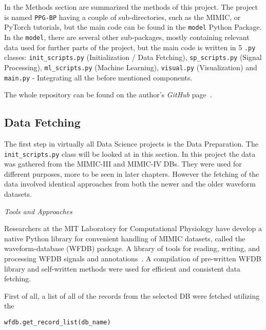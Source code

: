 In the Methods section are summarized the methods of this project.
The project is named \texttt{PPG-BP} having a couple of sub-directories, such as the MIMIC, or PyTorch tutorials, but the main code can be found in the \texttt{model} Python Package.
In the \texttt{model}, there are several other sub-packages, mostly containing relevant data used for further parts of the project, but the main code is written in 5 \texttt{.py} classes:
\texttt{init\_scripts.py} (Initialization / Data Fetching), \texttt{sp\_scripts.py} (Signal Processing), \texttt{ml\_scripts.py} (Machine Learning), \texttt{visual.py} (Visualization) and \texttt{main.py} - Integrating all the before mentioned components.

The whole repository can be found on the author's \textit{GitHub} page~\cite{jasinskasHtjasPPGBP2024}.

\subsection{Data Fetching}
\label{subsec:data-fetching}

The first step in virtually all Data Science projects is the Data Preparation.
The \texttt{init\_scripts.py} class will be looked at in this section.
In this project the data was gathered from the MIMIC-III and MIMIC-IV DBs.
They were used for different purposes, more to be seen in later chapters.
However the fetching of the data involved identical approaches from both the newer and the older waveform datasets.

\vspace{0.2cm}
\textit{Tools and Approaches}
\vspace{0.2cm}

Researchers at the MIT Laboratory for Computational Physiology have develop a native Python library for convenient handling of MIMIC datasets, called the waveform-database (WFDB) package.
A library of tools for reading, writing, and processing WFDB signals and annotations~\cite{MITLCPWfdbpython2024}.
A compilation of pre-written WFDB library and self-written methods were used for efficient and consistent data fetching.

First of all, a list of all of the records from the selected DB were fetched utilizing the

\vspace{0.1cm}
{\centering \texttt{wfdb.get\_record\_list(db\_name)}\par}
\vspace{0.1cm}


